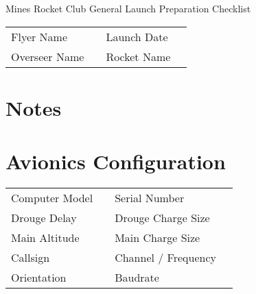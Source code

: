 \documentclass[12pt]{article}
\begin{document}
\pagestyle{fancy}
\begin{center}
	{\center \Large Mines Rocket Club General  Launch Preparation Checklist}\newline
\end{center}
\begin{tabular}{lclc}
	Flyer Name    & \framebox[45mm]{\rule{0pt}{7.5mm}} & Launch Date & \framebox[45mm]{\rule{0pt}{7.5mm}}\\
	Overseer Name & \framebox[45mm]{\rule{0pt}{7.5mm}} & Rocket Name & \framebox[45mm]{\rule{0pt}{7.5mm}}\\
\end{tabular}
\section*{Notes}
\framebox[7in]{\rule{0pt}{2in}}
\section*{Avionics Configuration}
\begin{tabular}{lclc}
	Computer Model    & \framebox[45mm]{\rule{0pt}{7.5mm}} & Serial Number & \framebox[45mm]{\rule{0pt}{7.5mm}}\\
	Drouge Delay    & \framebox[45mm]{\rule{0pt}{7.5mm}} & Drouge Charge Size & \framebox[45mm]{\rule{0pt}{7.5mm}}\\
	Main Altitude & \framebox[45mm]{\rule{0pt}{7.5mm}} & Main Charge Size & \framebox[45mm]{\rule{0pt}{7.5mm}}\\
	Callsign & \framebox[45mm]{\rule{0pt}{7.5mm}} & Channel / Frequency & \framebox[45mm]{\rule{0pt}{7.5mm}}\\
	Orientation & \framebox[45mm]{\rule{0pt}{7.5mm}} & Baudrate & \framebox[45mm]{\rule{0pt}{7.5mm}}\\
\end{tabular}
\end{document}
